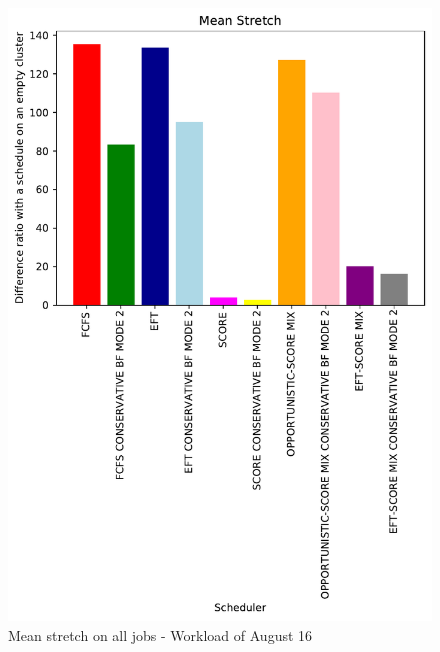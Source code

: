 \documentclass[conference,10pt]{IEEEtran}
\begin{document}
\begin{figure}\centering\includegraphics[width=1\linewidth]{../MBSS/plot/Results_FCFS_Score_Backfill_2022-08-16->2022-08-16_V10000_Mean_Stretch_450_128_32_256_4_1024.pdf}\caption{Mean stretch on all jobs - Workload of August 16}\end{figure}
\end{document}

